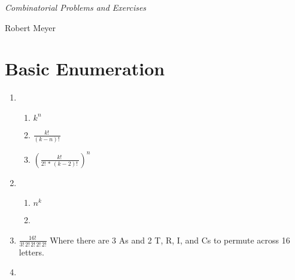 \documentclass[12pt]{article}
\begin{document}
\begin{center} \fontsize{20}{12} \emph{Combinatorial Problems and Exercises} \end{center}
\begin{center} \fontsize{18}{12} Robert Meyer \end{center}
\section*{\fontsize{18}{12} Basic Enumeration }
\begin{enumerate}
  \item \begin{enumerate}
  	\item $k^{n}$
	\item {$\frac{k!\,}{(k - n)!\,}$}
	\item {$(\frac{k!\,}{2!\, * \, (k - 2)!\,})^{n}$}
	\end{enumerate}
  \item \begin{enumerate}
        \item $n^k$
        \item 
        \end{enumerate}
 \item $\frac{16!\,}{3!\,2!\,2!\,2!\,2!}$ Where there are 3 As and 2 T, R, I, and Cs to permute across 16 letters.
 \item 
\end{enumerate}
\end{document}
